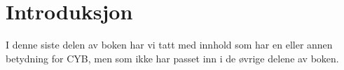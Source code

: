 \chapter*{Introduksjon}

I denne siste delen av boken har vi tatt med innhold som har en eller annen betydning for CYB, men som ikke har passet inn i de øvrige delene av boken.